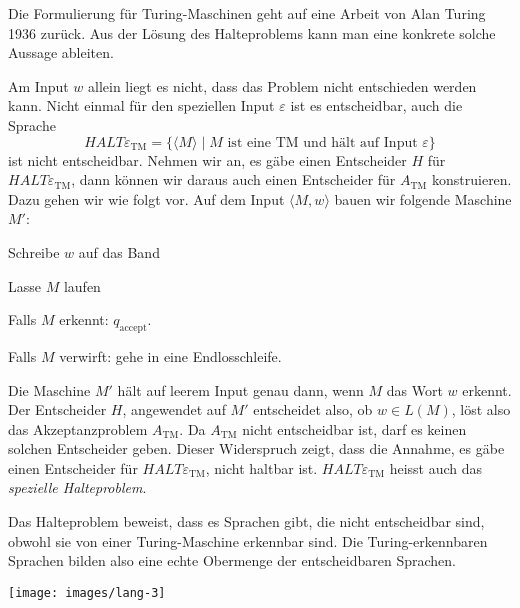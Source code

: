 Die Formulierung für Turing-Maschinen geht auf eine Arbeit von
Alan Turing 1936 zurück.
%
Aus der Lösung des Halteproblems kann
man eine konkrete solche Aussage ableiten.

Am Input $w$ allein liegt es nicht, dass das Problem nicht
entschieden werden kann.
Nicht einmal für den speziellen Input $\varepsilon$ ist es
entscheidbar, auch die Sprache
\[
\textit{HALT}\varepsilon_{\text{TM}}
=\{
\langle M\rangle \;|\;
\text{$M$ ist eine TM und hält auf Input $\varepsilon$}
\}
\]
%
ist nicht entscheidbar.
Nehmen wir an, es gäbe einen
Entscheider $H$ für $\textit{HALT}\varepsilon_{\text{TM}}$, dann können wir daraus
auch einen Entscheider für $A_{\text{TM}}$ konstruieren.
Dazu gehen wir wie folgt vor.
Auf dem Input $\langle M,w\rangle$ bauen wir folgende Maschine $M'$:
\medskip
\begin{compactenum}
\item Schreibe $w$ auf das Band
\item Lasse $M$ laufen
\item Falls $M$ erkennt: $q_{\text{accept}}$.
\item Falls $M$ verwirft: gehe in eine Endlosschleife.
\end{compactenum}
\medskip
Die Maschine $M'$ hält auf leerem Input genau dann, wenn $M$
das Wort $w$ erkennt.
Der Entscheider $H$, angewendet auf $M'$
entscheidet also, ob $w\in L(M)$, löst also das Akzeptanzproblem
$A_{\text{TM}}$.
Da $A_{\text{TM}}$ nicht entscheidbar ist, darf es keinen solchen
Entscheider geben.
Dieser Widerspruch zeigt, dass die Annahme, es
gäbe einen Entscheider für $\textit{HALT}\varepsilon_{\text{TM}}$,
nicht haltbar ist.
$\textit{HALT}\varepsilon_{\text{TM}}$ heisst
auch das {\em spezielle Halteproblem}.
%

Das Halteproblem beweist, dass es Sprachen gibt, die nicht
entscheidbar sind, obwohl sie von einer Turing-Maschine
erkennbar sind.
Die Turing-erkennbaren Sprachen bilden also eine
echte Obermenge der entscheidbaren Sprachen.
\begin{center}
\texttt{[image: images/lang-3]}
\end{center}


